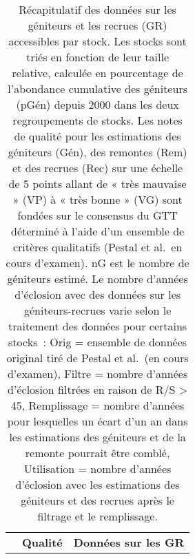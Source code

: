 \documentclass[french,11pt]{book}
\begin{document}
\endgroup{} \endgroup{}

\clearpage



\begingroup\fontsize{10}{12}\selectfont \begingroup\fontsize{10}{12}\selectfont  
\begin{longtable}[t]{llrrlllrrrr} \caption{\label{tab:DataOverviewSkeena}Récapitulatif des données sur les géniteurs et les recrues (GR) accessibles par stock. Les stocks sont triés en fonction de leur taille relative, calculée en pourcentage de l'abondance cumulative des géniteurs (pGén) depuis 2000 dans les deux regroupements de stocks. Les notes de qualité pour les estimations des géniteurs (Gén), des remontes (Rem) et des recrues (Rec) sur une échelle de 5 points allant de « très mauvaise » (VP) à « très bonne » (VG) sont fondées sur le consensus du GTT déterminé à l'aide d'un ensemble de critères qualitatifs (Pestal et al.~en cours d'examen). nG est le nombre de géniteurs estimé. Le nombre d'années d'éclosion avec des données sur les géniteurs-recrues varie selon le traitement des données pour certains stocks~: Orig = ensemble de données original tiré de Pestal et al.~(en cours d'examen), Filtre = nombre d'années d'éclosion filtrées en raison de R/S \textgreater{} 45, Remplissage = nombre d'années pour lesquelles un écart d'un an dans les estimations des géniteurs et de la remonte pourrait être comblé, Utilisation = nombre d'années d'éclosion avec les estimations des géniteurs et des recrues après le filtrage et le remplissage.}\\ \toprule
\multicolumn{4}{c}{\textbf{ }} & \multicolumn{3}{c}{\textbf{Qualité}} & \multicolumn{4}{c}{\textbf{Données sur les GR}} \\

\end{longtable}
\end{document}
